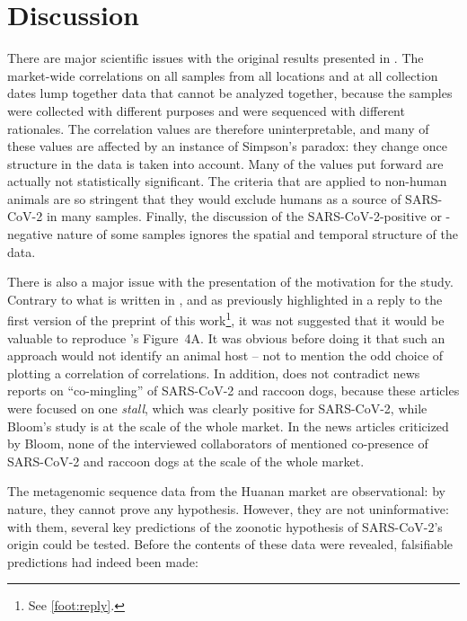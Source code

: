\documentclass[11pt]{article}
\def \sct {\mbox{SARS-CoV-2}}
\begin{document}
\section{Discussion}
There are major scientific issues with the original results presented in \citet{Bloom2023VE}. The market-wide correlations on all samples from all locations and at all collection dates lump together data that cannot be analyzed together, because the samples were collected with different purposes and were sequenced with different rationales. The correlation values are therefore uninterpretable, and many of these values are affected by an instance of Simpson's paradox: they change once structure in the data is taken into account. Many of the values put forward are actually not statistically significant. The criteria that are applied to non-human animals are so stringent that they would exclude humans as a source of \sct{} in many samples. Finally, the discussion of the \sct{}-positive or -negative nature of some samples ignores the spatial and temporal structure of the data.
  
There is also a major issue with the presentation of the motivation for the study. Contrary to what is written in \citet{Bloom2023VE}, and as previously highlighted in a reply to the first version of the preprint of this work\footnote{See \cref{foot:reply}.}, it was not suggested that it would be valuable to reproduce \citet{Liu2022RS}'s Figure~4A. It was obvious before doing it \citep{ACC2023Zenodo} that such an approach would not identify an animal host -- not to mention the odd choice of plotting a correlation of correlations. In addition, \citet{Bloom2023VE} does not contradict news reports on ``co-mingling'' of SARS-CoV-2 and raccoon dogs, because these articles were focused on one \textit{stall}, which was clearly positive for \sct{}, while Bloom's study is at the scale of the whole market. In the news articles criticized by Bloom, none of the interviewed collaborators of \citet{ACC2023Zenodo} mentioned co-presence of \sct{} and raccoon dogs at the scale of the whole market. 
 
The metagenomic sequence data from the Huanan market are observational: by nature, they cannot prove any hypothesis. However, they are not uninformative: with them, several key predictions of the zoonotic hypothesis of \sct{}'s origin could be tested. Before the contents of these data were revealed, falsifiable predictions had indeed been made: 
\end{document}

